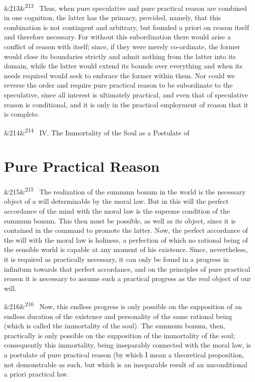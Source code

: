 \documentclass[12pt]{article}
\newcommand{\para}[1][]{\par\noindent\ifx&#1&\else\textsuperscript{\footnotesize #1}~\fi}
\begin{document}
\para[213] Thus, when pure speculative and pure practical reason are combined in one cognition, the latter has the primacy, provided, namely, that this combination is not contingent and arbitrary, but founded a priori on reason itself and therefore necessary. For without this subordination there would arise a conflict of reason with itself; since, if they were merely co-ordinate, the former would close its boundaries strictly and admit nothing from the latter into its domain, while the latter would extend its bounds over everything and when its needs required would seek to embrace the former within them. Nor could we reverse the order and require pure practical reason to be subordinate to the speculative, since all interest is ultimately practical, and even that of speculative reason is conditional, and it is only in the practical employment of reason that it is complete.

\para[214] IV. The Immortality of the Soul as a Postulate of

\section*{Pure Practical Reason}

\para[215] The realization of the summum bonum in the world is the necessary object of a will determinable by the moral law. But in this will the perfect accordance of the mind with the moral law is the supreme condition of the summum bonum. This then must be possible, as well as its object, since it is contained in the command to promote the latter. Now, the perfect accordance of the will with the moral law is holiness, a perfection of which no rational being of the sensible world is capable at any moment of his existence. Since, nevertheless, it is required as practically necessary, it can only be found in a progress in infinitum towards that perfect accordance, and on the principles of pure practical reason it is necessary to assume such a practical progress as the real object of our will.

\para[216] Now, this endless progress is only possible on the supposition of an endless duration of the existence and personality of the same rational being (which is called the immortality of the soul). The summum bonum, then, practically is only possible on the supposition of the immortality of the soul; consequently this immortality, being inseparably connected with the moral law, is a postulate of pure practical reason (by which I mean a theoretical proposition, not demonstrable as such, but which is an inseparable result of an unconditional a priori practical law.
\end{document}

